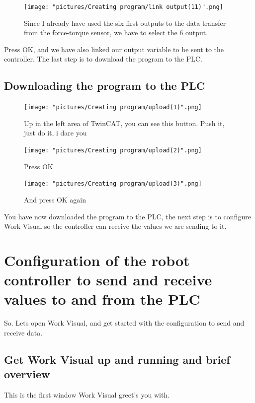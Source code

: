 \documentclass{article}
\begin{document}
\begin{figure}[h!]
    \centering
    \texttt{[image: "pictures/Creating program/link output(11)".png]}
    \caption{Since I already have used the six first outputs to the data transfer from the force-torque sensor, we have to select the 6 output.}
   
\end{figure}

Press OK, and we have also linked our output variable to be sent to the controller. The last step is to download the program to the PLC.

\newpage

\subsection{Downloading the program to the PLC}



\begin{figure}[h!]
    \centering
    \texttt{[image: "pictures/Creating program/upload(1)".png]}
    \caption{Up in the left area of TwinCAT, you can see this button. Push it, just do it, i dare you}
   
\end{figure}

\begin{figure}[h!]
    \centering
    \texttt{[image: "pictures/Creating program/upload(2)".png]}
    \caption{Press OK}
  
\end{figure}

\begin{figure}[h!]
    \centering
    \texttt{[image: "pictures/Creating program/upload(3)".png]}
    \caption{And press OK again}
   
\end{figure}

You have now downloaded the program to the PLC, the next step is to configure Work Visual so the controller can receive the values we are sending to it.

\newpage

\section{Configuration of the robot controller to send and receive values to and from the PLC}
So. Lets open Work Visual, and get started with the configuration to send and receive data. 

\subsection{Get Work Visual up and running and brief overview}
This is the first window Work Visual greet's you with. 
\end{document}
